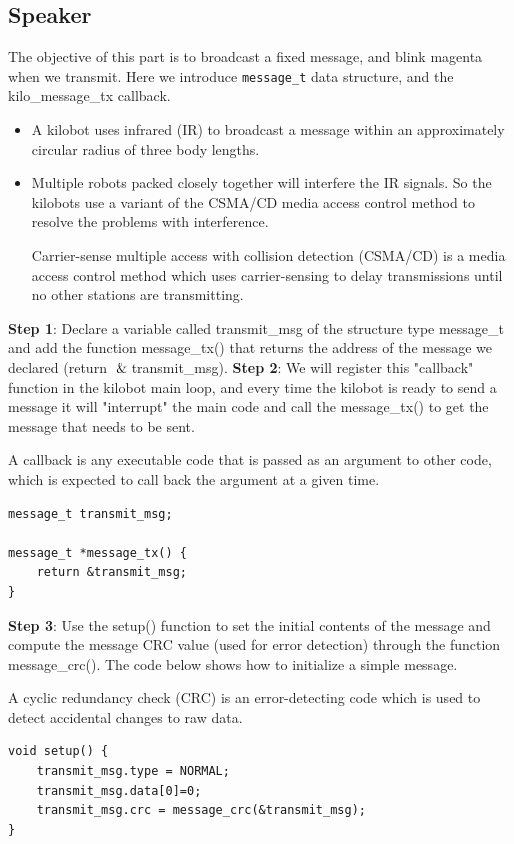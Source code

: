 \documentclass{report}[12pt]
\begin{document}
\subsection{Speaker}
 The objective of this part is to broadcast a fixed message, and blink magenta when we transmit. Here we introduce \texttt{message\_t} data structure, and the kilo\_message\_tx callback.
\begin{itemize}
\item A kilobot uses infrared (IR) to broadcast a message within an approximately circular radius of three body lengths.

\item  Multiple robots packed closely together will interfere the IR signals. So the kilobots use a variant of the CSMA/CD media access control method  to resolve the problems with interference.\par

Carrier-sense multiple access with collision detection (CSMA/CD) is a media access control method which uses carrier-sensing to delay transmissions until no other stations are transmitting. 
\end{itemize}

\noindent \textbf{Step 1}: Declare a variable called transmit\_msg of the structure type message\_t and add the function message\_tx() that returns the address of the message we declared (return $\And$transmit\_msg).
\newline
\newline
 \noindent \textbf{Step 2}: We will register this "callback" function in the kilobot main loop, and every time the kilobot is ready to send a message it will "interrupt" the main code and call the message\_tx() to get the message that needs to be sent.\par
 A callback is any executable code that is passed as an argument to other code, which is expected to call back the argument at a given time.
\begin{verbatim}
message_t transmit_msg;

message_t *message_tx() {
    return &transmit_msg;
} 

\end{verbatim}
\noindent \textbf{Step 3}:
 Use the setup() function to set the initial contents of the message and compute the message CRC value (used for error detection) through the function message\_crc(). The code below shows how to initialize a simple message. \par
 A cyclic redundancy check (CRC) is an error-detecting code which is used to detect accidental changes to raw data.
\begin{verbatim}
void setup() {
    transmit_msg.type = NORMAL;
    transmit_msg.data[0]=0;
    transmit_msg.crc = message_crc(&transmit_msg);
}
\end{verbatim}
\end{document}
